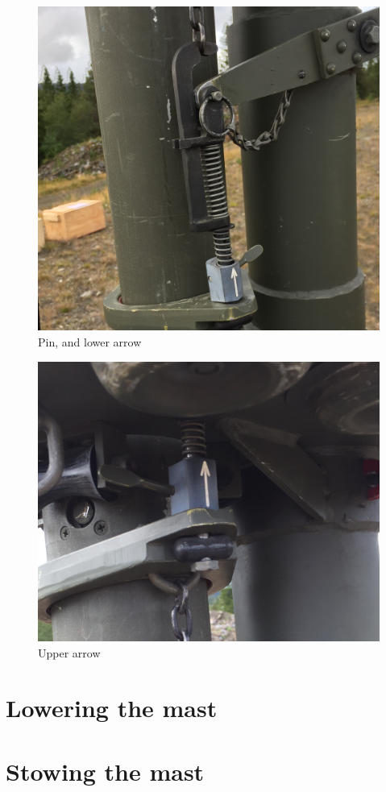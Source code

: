 \documentclass{article}
\begin{document}
\begin{figure}[h]
	\centering
	\includegraphics[width=\linewidth]{img/Pin.JPG}
	\caption{Pin, and lower arrow}
	\label{fig:pin}
\end{figure}

\begin{figure}[h]
	\centering
	\includegraphics[width=\linewidth]{img/Arrow2.JPG}
	\caption{Upper arrow}
	\label{fig:arrow2}
\end{figure}

\section{Lowering the mast}

\section{Stowing the mast}
\end{document}
